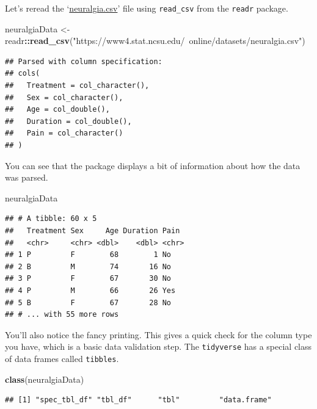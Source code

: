 \documentclass[
]{book}
\newenvironment{Shaded}{\begin{snugshade}}{\end{snugshade}}
\newcommand{\KeywordTok}[1]{\textcolor[rgb]{0.13,0.29,0.53}{\textbf{#1}}}
\newcommand{\NormalTok}[1]{#1}
\newcommand{\OperatorTok}[1]{\textcolor[rgb]{0.81,0.36,0.00}{\textbf{#1}}}
\newcommand{\StringTok}[1]{\textcolor[rgb]{0.31,0.60,0.02}{#1}}
\theoremstyle{definition}
\theoremstyle{definition}
\theoremstyle{definition}
\theoremstyle{remark}
\begin{document}
Let's reread the `\href{https://www4.stat.ncsu.edu/~online/datasets/neuralgia.csv}{neuralgia.csv}' file using \texttt{read\_csv} from the \texttt{readr} package.

\begin{Shaded}
\begin{Highlighting}[]
\NormalTok{neuralgiaData <-}\StringTok{ }\NormalTok{readr}\OperatorTok{::}\KeywordTok{read_csv}\NormalTok{(}\StringTok{"https://www4.stat.ncsu.edu/~online/datasets/neuralgia.csv"}\NormalTok{)}
\end{Highlighting}
\end{Shaded}

\begin{verbatim}
## Parsed with column specification:
## cols(
##   Treatment = col_character(),
##   Sex = col_character(),
##   Age = col_double(),
##   Duration = col_double(),
##   Pain = col_character()
## )
\end{verbatim}

You can see that the package displays a bit of information about how the data was parsed.

\begin{Shaded}
\begin{Highlighting}[]
\NormalTok{neuralgiaData}
\end{Highlighting}
\end{Shaded}

\begin{verbatim}
## # A tibble: 60 x 5
##   Treatment Sex     Age Duration Pain 
##   <chr>     <chr> <dbl>    <dbl> <chr>
## 1 P         F        68        1 No   
## 2 B         M        74       16 No   
## 3 P         F        67       30 No   
## 4 P         M        66       26 Yes  
## 5 B         F        67       28 No   
## # ... with 55 more rows
\end{verbatim}

You'll also notice the fancy printing. This gives a quick check for the column type you have, which is a basic data validation step. The \texttt{tidyverse} has a special class of data frames called \texttt{tibbles}.

\begin{Shaded}
\begin{Highlighting}[]
\KeywordTok{class}\NormalTok{(neuralgiaData)}
\end{Highlighting}
\end{Shaded}

\begin{verbatim}
## [1] "spec_tbl_df" "tbl_df"      "tbl"         "data.frame"
\end{verbatim}
\end{document}
